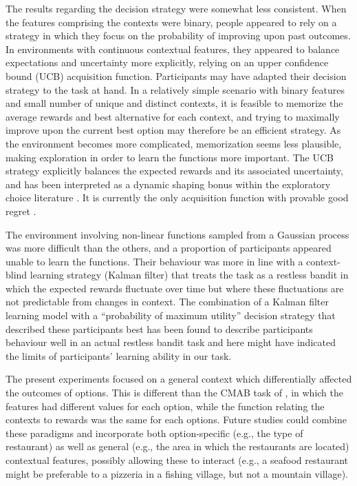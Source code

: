 \documentclass[a4paper,natbib]{apa6}
\begin{document}
The results regarding the decision strategy were somewhat less consistent. When the features comprising the contexts were binary, people appeared to rely on a strategy in which they focus on the probability of improving upon past outcomes. In environments with continuous contextual features, they appeared to balance expectations and uncertainty more explicitly, relying on an upper confidence bound (UCB) acquisition function. Participants may have adapted their decision strategy to the task at hand. In a relatively simple scenario with binary features and small number of unique and distinct contexts, it is feasible to memorize the average rewards and best alternative for each context, and trying to maximally improve upon the current best option may therefore be an efficient strategy. As the environment becomes more complicated, memorization seems less plausible, making exploration in order to learn the functions more important. The UCB strategy explicitly balances the expected rewards and its associated uncertainty, and has been interpreted as a dynamic shaping bonus within the exploratory choice literature \citep{daw2006cortical}. It is currently the only acquisition function with provable good regret \citep{srinivas2012information}.  

The environment involving non-linear functions sampled from a Gaussian process was more difficult than the others, and a proportion of participants appeared unable to learn the functions. Their behaviour was more in line with a context-blind learning strategy (Kalman filter) that treats the task as a restless bandit in which the expected rewards fluctuate over time but where these fluctuations are not predictable from changes in context. The combination of a Kalman filter learning model with a ``probability of maximum utility'' decision strategy that described these participants best has been found to describe participants behaviour well in an actual restless bandit task \cite{speekenbrinkuncertainty} and here might have indicated the limits of participants' learning ability in our task.

The present experiments focused on a general context which differentially affected the outcomes of options. This is different than the CMAB task of \cite{stojic2015human}, in which the features had different values for each option, while the function relating the contexts to rewards was the same for each options. Future studies could combine these paradigms and incorporate both option-specific  (e.g., the type of restaurant) as well as general (e.g., the area in which the restaurants are located) contextual features, possibly allowing these to interact (e.g., a seafood restaurant might be preferable to a pizzeria in a fishing village, but not a mountain village). 
\end{document}
